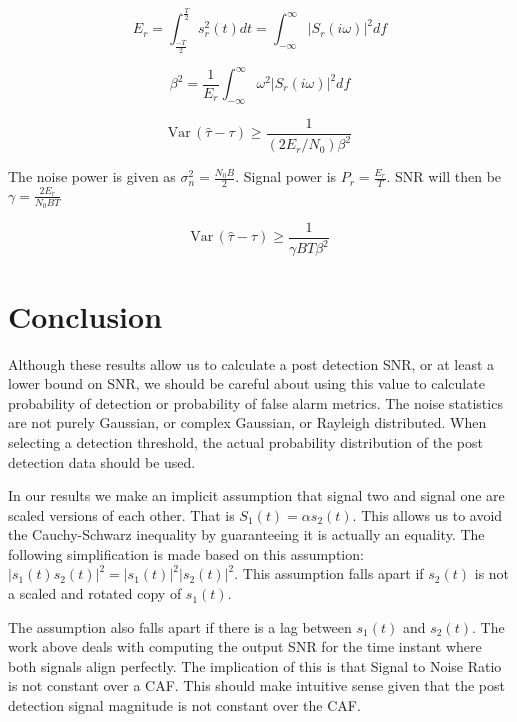 \documentclass[11pt]{article}
\def\Var{{\textrm{Var}}\,}
\begin{document}
\begin{equation}
E_r = \int^\frac{T}{2}_\frac{-T}{2} s_r^2(t)dt = \int^\infty_{-\infty} |S_r(i\omega)|^2 df
\end{equation}

\begin{equation}
\beta^2 = \frac{1}{E_r} \int^\infty_{-\infty} \omega^2 |S_r(i\omega)|^2 df
\end{equation}

\begin{equation}
\Var(\hat{\tau} - \tau)
\geq
\frac{1}{(2E_r/N_0)\beta^2}
\end{equation}

The noise power is given as $\sigma_n^2 = \frac{N_0B}{2}$. Signal power is $P_r = \frac{E_r}{T}$. SNR will then be $\gamma = \frac{2E_r}{N_0BT}$

\begin{equation}
\boxed{
\Var(\hat{\tau} - \tau)
\geq
\frac{1}{\gamma BT\beta^2}
}
\end{equation}


\section{Conclusion}

Although these results allow us to calculate a post detection SNR, or at least a lower bound on SNR, we should be careful about using this value to calculate probability of detection or probability of false alarm metrics. The noise statistics are not purely Gaussian, or complex Gaussian, or Rayleigh distributed. When selecting a detection threshold, the actual probability distribution of the post detection data should be used.

In our results we make an implicit assumption that signal two and signal one are scaled versions of each other. That is $S_1(t) = \alpha s_2(t)$. This allows us to avoid the Cauchy-Schwarz inequality by guaranteeing it is actually an equality. The following simplification is made based on this assumption: $|s_1(t)s_2(t)|^2 = |s_1(t)|^2|s_2(t)|^2$. This assumption falls apart if $s_2(t)$ is not a scaled and rotated copy of $s_1(t)$.

The assumption also falls apart if there is a lag between $s_1(t)$ and $s_2(t)$. The work above deals with computing the output SNR for the time instant where both signals align perfectly. The implication of this is that Signal to Noise Ratio is not constant over a CAF. This should make intuitive sense given that the post detection signal magnitude is not constant over the CAF.

\end{document}

